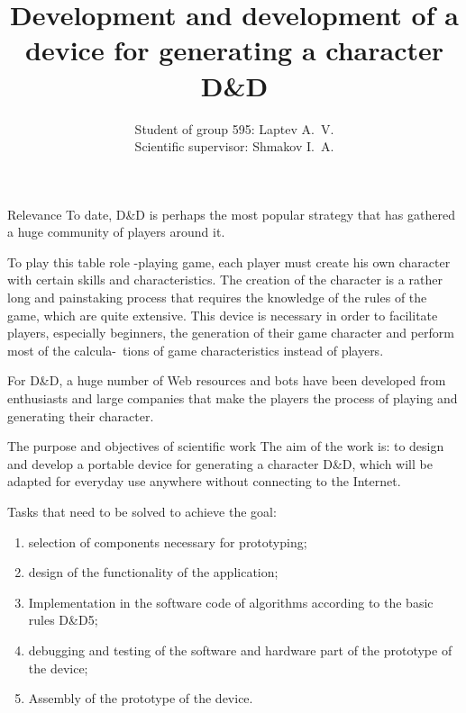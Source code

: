 \documentclass[12pt,a4paper,mathserif]{beamer}
\author[Laptev A.V.]{{Student of group 595: Laptev A.~V.}\\
{Scientific supervisor: Shmakov I.~A.}}
\title[Barnaul 2023]{Development and development of a device for generating a character D\&D}
\begin{document}
\begin{frame}
\maketitle
\end{frame}

\begin{frame}{Relevance}
    \setlength{\parindent}{0.5cm}
    To date, D\&D is perhaps the most popular strategy that has gathered a huge community of players around it.

    To play this table role -playing game, each player must create his own character with certain skills and characteristics. The creation of the character is a rather long and painstaking process that requires the knowledge of the rules of the game, which are quite extensive. This device is necessary in order to facilitate players, especially beginners, the generation of their game character and perform most of the calcula-\ tions of game characteristics instead of players.
    
     For D\&D, a huge number of Web resources and bots have been developed from enthusiasts and large companies that make the players the process of playing and generating their character.
\end{frame}

\begin{frame}{The purpose and objectives of scientific work}
    \setlength{\parindent}{0.5cm}
    The aim of the work is: to design and develop a portable device for generating a character D\&D, which will be adapted for everyday use anywhere without connecting to the Internet.

     Tasks that need to be solved to achieve the goal:

    \begin{enumerate}
        \item selection of components necessary for prototyping;
        
        \item design of the functionality of the application;
        
        \item Implementation in the software code of algorithms according to the basic rules D\&D5;
        
        \item debugging and testing of the software and hardware part of the prototype of the device;
        
        \item Assembly of the prototype of the device.
    \end{enumerate}
\end{frame}
\end{document}
